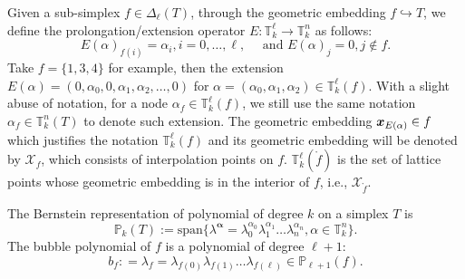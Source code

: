 \documentclass[mathpazo]{cicp}
\begin{document}
Given a sub-simplex $f\in \Delta_{\ell}(T)$, through the geometric embedding $f \hookrightarrow T$, we define the prolongation/extension operator $E: \mathbb T^{\ell}_k \to \mathbb T^{n}_k$ as follows:
\begin{equation}\label{eq:Ealpha}
E(\alpha)_{f(i)} = \alpha_{i}, i=0,\ldots, \ell, \quad \text{ and } E(\alpha)_j = 0, j\not\in f.
\end{equation}
Take $f = \{ 1, 3, 4\}$ for example,
then the extension $ E(\alpha)= (0, \alpha_{0}, 0, \alpha_{1}, \alpha_{2}, \ldots, 0)$ for 
$\alpha = ( \alpha_{0},\alpha_{1},\alpha_{2})\in \mathbb T^{\ell}_k(f)$. 
With a slight abuse of notation, for a node $\alpha_f\in \mathbb T^{\ell}_k(f)$, we still use the same notation $\alpha_f\in \mathbb T^{n}_k(T)$ to denote such extension. 
The geometric embedding $\boldsymbol x_{E(\alpha)}\in f$ which justifies the notation $\mathbb T^{\ell}_k(f)$ and its geometric embedding will be denoted by $\mathcal X_f$, which consists of interpolation points on $f$. $\mathbb T^{\ell}_k(\mathring{f})$ is the set of lattice points whose geometric embedding is in the interior of $f$, i.e., $\mathcal X_{\mathring{f}}$. 


The Bernstein representation of polynomial of degree $k$ on a simplex $T$ is
$$
\mathbb P_k(T) := \textrm{span} \{ \lambda^{\boldsymbol \alpha} = \lambda_{0}^{\alpha_0}\lambda_{1}^{\alpha_1}\ldots \lambda_{n}^{\alpha_n}, \alpha\in \mathbb T_k^{n}\}.
$$
The bubble polynomial of $f$ is a polynomial of degree $\ell + 1$:
$$
b_f: = \lambda_{f} = \lambda_{f(0)}\lambda_{f(1)}\ldots \lambda_{f(\ell)}\in \mathbb P_{\ell + 1}(f).
$$

%
%
 
\end{document}
